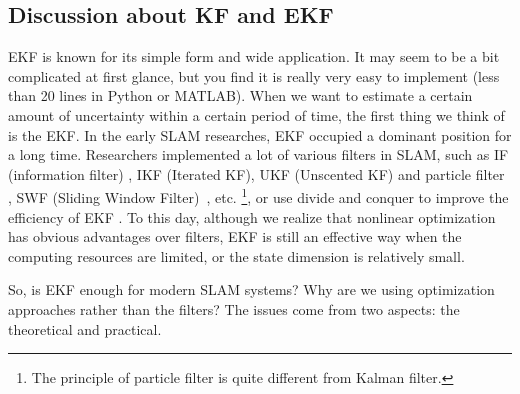 \subsection{Discussion about KF and EKF}
EKF is known for its simple form and wide application. It may seem to be a bit complicated at first glance, but you find it is really very easy to implement (less than 20 lines in Python or MATLAB).  When we want to estimate a certain amount of uncertainty within a certain period of time, the first thing we think of is the EKF. In the early SLAM researches, EKF occupied a dominant position for a long time. Researchers implemented a lot of various filters in SLAM, such as IF (information filter) {\cite{Sujan2005} }, IKF {\cite{Janabi-Sharifi2010}} (Iterated KF), UKF {\cite{Li2010}} (Unscented KF) and particle filter  {\cite{Sim2007, Lee2011, Gil2010a}} , SWF (Sliding Window \mbox{Filter) {\cite{Sibley2010}}}, etc. {\cite{Chen2012}} \footnote{The principle of particle filter is quite different from Kalman filter. }, or use divide and conquer to improve the efficiency of EKF {\cite{Paz2008, Grasa2011}}. To this day, although we realize that nonlinear optimization has obvious advantages over filters, EKF is still an effective way when the computing resources are limited, or the state dimension is relatively small.

So, is EKF enough for modern SLAM systems? Why are we using optimization approaches rather than the filters? The issues come from two aspects: the theoretical and practical. 


